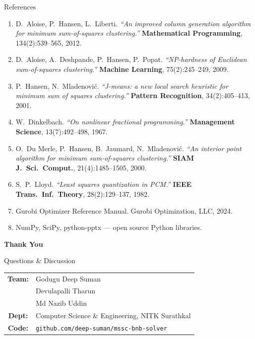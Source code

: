 \documentclass[aspectratio=169,12pt]{beamer}
\begin{document}
\begin{frame}[allowframebreaks]{References}
  \small
  \begin{enumerate}
    \item D.\ Aloise, P.\ Hansen, L.\ Liberti. \textit{``An improved column generation algorithm for minimum sum-of-squares clustering.''} \textbf{Mathematical Programming}, 134(2):539--565, 2012.
    \item D.\ Aloise, A.\ Deshpande, P.\ Hansen, P.\ Popat. \textit{``NP-hardness of Euclidean sum-of-squares clustering.''} \textbf{Machine Learning}, 75(2):245--249, 2009.
    \item P.\ Hansen, N.\ Mladenović. \textit{``J-means: a new local search heuristic for minimum sum of squares clustering.''} \textbf{Pattern Recognition}, 34(2):405--413, 2001.
    \item W.\ Dinkelbach. \textit{``On nonlinear fractional programming.''} \textbf{Management Science}, 13(7):492--498, 1967.
    \item O.\ Du Merle, P.\ Hansen, B.\ Jaumard, N.\ Mladenović. \textit{``An interior point algorithm for minimum sum-of-squares clustering.''} \textbf{SIAM J.\ Sci.\ Comput.}, 21(4):1485--1505, 2000.
    \item S.\ P.\ Lloyd. \textit{``Least squares quantization in PCM.''} \textbf{IEEE Trans.\ Inf.\ Theory}, 28(2):129--137, 1982.
    \item Gurobi Optimizer Reference Manual. Gurobi Optimization, LLC, 2024.
    \item NumPy, SciPy, python-pptx — open source Python libraries.
  \end{enumerate}
\end{frame}

\begin{frame}[plain]
  \begin{center}
    \vspace{1.5cm}
    {\Huge \textbf{Thank You}}

    \vspace{1cm}
    {\large Questions \& Discussion}

    \vspace{1.5cm}
    \begin{tabular}{cl}
      \textbf{Team:} & Godugu Deep Suman \\
                     & Devulapalli Tharun \\
                     & Md Nazib Uddin \\[6pt]
      \textbf{Dept:} & Computer Science \& Engineering, NITK Surathkal \\[6pt]
      \textbf{Code:} & \texttt{github.com/deep-suman/mssc-bnb-solver} \\
    \end{tabular}
  \end{center}
\end{frame}
\end{document}
